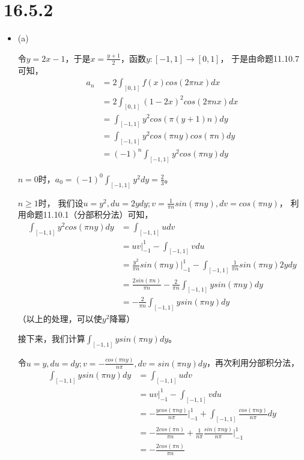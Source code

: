 \documentclass{article}
\begin{document}
\section*{16.5.2}

\begin{itemize}
  \item (a)

        令$y = 2x - 1$，于是$x = \frac{y + 1}{2}$，函数$y: [-1, 1] \to [0, 1]$，
        于是由命题11.10.7可知，
        \begin{align*}
          a_n & = 2\int_{[0, 1]} f(x) cos(2\pi nx) dx         \\
              & = 2\int_{[0, 1]} (1 - 2x)^2 cos(2\pi nx) dx   \\
              & = \int_{[-1, 1]} y^2 cos(\pi(y + 1)n) dy      \\
              & = \int_{[-1, 1]} y^2 cos(\pi ny)cos(\pi n) dy \\
              & = (-1)^n\int_{[-1, 1]} y^2 cos(\pi ny) dy
        \end{align*}

        $n = 0$时，$a_0 = (-1)^0\int_{[-1, 1]} y^2 dy = \frac{2}{3}$。

        $n \geq 1$时，
        我们设$u = y^2, du = 2ydy; v = \frac{1}{\pi n}sin(\pi ny), dv = cos(\pi ny)$，
        利用命题11.10.1（分部积分法）可知，
        \begin{align*}
          \int_{[-1, 1]} y^2 cos(\pi ny) dy
           & = \int_{[-1, 1]} u dv                                                                  \\
           & = uv|_{-1}^1 - \int_{[-1, 1]} v du                                                     \\
           & = \frac{y^2}{\pi n}sin(\pi ny)|_{-1}^1 - \int_{[-1, 1]} \frac{1}{\pi n}sin(\pi ny)2ydy \\
           & = \frac{2sin(\pi n)}{\pi n} - \frac{2}{\pi n}\int_{[-1, 1]} ysin(\pi ny) dy            \\
           & = - \frac{2}{\pi n}\int_{[-1, 1]} ysin(\pi ny) dy
        \end{align*}
        （以上的处理，可以使$y^2$降幂）

        接下来，我们计算$\int_{[-1, 1]} ysin(\pi ny) dy$。

        令$u = y, du = dy; v = -\frac{cos(\pi ny)}{n\pi}, dv = sin(\pi ny)dy$，再次利用分部积分法，
        \begin{align*}
          \int_{[-1, 1]} ysin(\pi ny) dy
           & = \int_{[-1, 1]} u dv                                                            \\
           & = uv|_{-1}^1 - \int_{[-1, 1]} v du                                               \\
           & = -\frac{ycos(\pi ny)}{n\pi}|_{-1}^1 + \int_{[-1, 1]} \frac{cos(\pi ny)}{n\pi}dy \\
           & = -\frac{2cos(\pi n)}{\pi n} + \frac{1}{n\pi} \frac{sin(\pi ny)}{n \pi}|_{-1}^1  \\
           & = -\frac{2cos(\pi n)}{\pi n}
        \end{align*}


\end{itemize}
\end{document}
